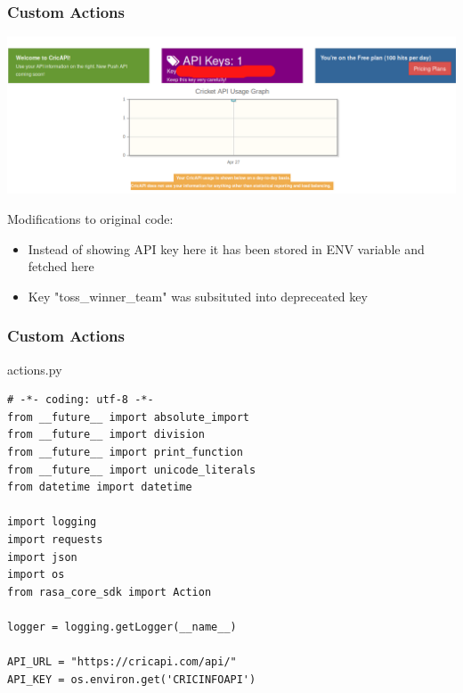  \begin{frame}[fragile]\frametitle{Custom Actions}

\begin{center}
\includegraphics[width=\linewidth,keepaspectratio]{images/lala-1140x399.png}
\end{center}

Modifications to original code:

\begin{itemize}
\item Instead of showing API key here it has been stored in ENV variable and fetched here
\item  Key "toss\_winner\_team" was subsituted into depreceated key
\end{itemize}

\end{frame}


 \begin{frame}[fragile]\frametitle{Custom Actions}

 actions.py

\begin{lstlisting}
# -*- coding: utf-8 -*-
from __future__ import absolute_import
from __future__ import division
from __future__ import print_function
from __future__ import unicode_literals
from datetime import datetime

import logging
import requests
import json
import os
from rasa_core_sdk import Action

logger = logging.getLogger(__name__)

API_URL = "https://cricapi.com/api/"
API_KEY = os.environ.get('CRICINFOAPI')
\end{lstlisting}
\end{frame}

